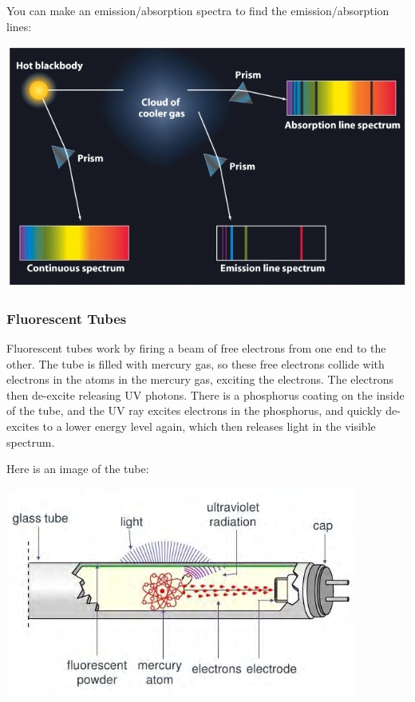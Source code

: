 \documentclass[a4paper, 12pt]{article}
\begin{document}
You can make an emission/absorption spectra to find the emission/absorption lines:

\includegraphics[width=\textwidth]{images/spectraElecEmmision.jpg}

\subsubsection{Fluorescent Tubes}

Fluorescent tubes work by firing a beam of free electrons from one end to the other.
The tube is filled with mercury gas, so these free electrons collide with electrons in the atoms in the mercury gas, exciting the electrons. The electrons then de-excite releasing UV photons. There is a phosphorus coating on the inside of the tube, and the UV ray excites electrons in the phosphorus, and quickly de-excites to a lower energy level again, which then releases light in the visible spectrum.

Here is an image of the tube:

\includegraphics[width=\textwidth]{images/mercuryTube.png}
\end{document}
